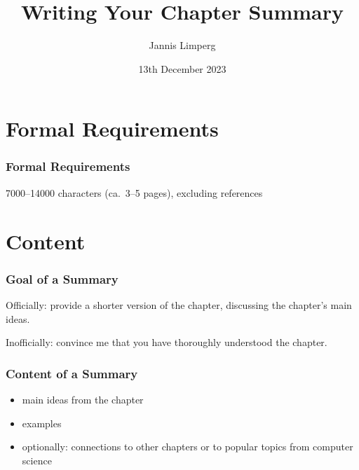 \documentclass[xetex]{beamer}
\begin{document}
\title{Writing Your Chapter Summary}
\author{Jannis Limperg}
\date{13th December 2023}

\begin{frame}
  \maketitle
\end{frame}

\begin{frame}
  \tableofcontents[hideallsubsections]
\end{frame}

\section{Formal Requirements}

\begin{frame}
  \frametitle{Formal Requirements}

  \begin{center}
    7000--14000 characters (ca.\ 3--5 pages), excluding references
  \end{center}
\end{frame}

\section{Content}

\begin{frame}
  \frametitle{Goal of a Summary}

  Officially: provide a shorter version of the chapter, discussing the chapter's main ideas.

  \medskip
  \pause

  Inofficially: convince me that you have thoroughly understood the chapter.
\end{frame}

\begin{frame}
  \frametitle{Content of a Summary}

  \begin{itemize}
    \item main ideas from the chapter
    \item examples
    \item optionally: connections to other chapters or to popular topics from computer science
  \end{itemize}
\end{frame}
\end{document}
